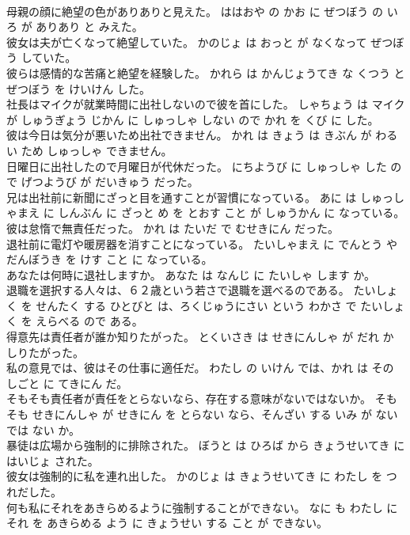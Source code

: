 \documentclass[8pt]{extreport}
\begin{document}
\begin{CJK}{UTF8}{min}
\\	母親の顔に絶望の色がありありと見えた。	ははおや の かお に ぜつぼう の いろ が ありあり と みえた。	
\\	彼女は夫が亡くなって絶望していた。	かのじょ は おっと が なくなって ぜつぼう していた。	
\\	彼らは感情的な苦痛と絶望を経験した。	かれら は かんじょうてき な くつう と ぜつぼう を けいけん した。	
\\	社長はマイクが就業時間に出社しないので彼を首にした。	しゃちょう は マイク が しゅうぎょう じかん に しゅっしゃ しない ので かれ を くび に した。	
\\	彼は今日は気分が悪いため出社できません。	かれ は きょう は きぶん が わるい ため しゅっしゃ できません。	
\\	日曜日に出社したので月曜日が代休だった。	にちようび に しゅっしゃ した ので げつようび が だいきゅう だった。	
\\	兄は出社前に新聞にざっと目を通すことが習慣になっている。	あに は しゅっしゃまえ に しんぶん に ざっと め を とおす こと が しゅうかん に なっている。	
\\	彼は怠惰で無責任だった。	かれ は たいだ で むせきにん だった。	
\\	退社前に電灯や暖房器を消すことになっている。	たいしゃまえ に でんとう や だんぼうき を けす こと に なっている。	
\\	あなたは何時に退社しますか。	あなた は なんじ に たいしゃ します か。	
\\	退職を選択する人々は、６２歳という若さで退職を選べるのである。	たいしょく を せんたく する ひとびと は、ろくじゅうにさい という わかさ で たいしょく を えらべる ので ある。	
\\	得意先は責任者が誰か知りたがった。	とくいさき は せきにんしゃ が だれ か しりたがった。	
\\	私の意見では、彼はその仕事に適任だ。	わたし の いけん では、かれ は その しごと に てきにん だ。	
\\	そもそも責任者が責任をとらないなら、存在する意味がないではないか。	そもそも せきにんしゃ が せきにん を とらない なら、そんざい する いみ が ない では ない か。	
\\	暴徒は広場から強制的に排除された。	ぼうと は ひろば から きょうせいてき に はいじょ された。	
\\	彼女は強制的に私を連れ出した。	かのじょ は きょうせいてき に わたし を つれだした。	
\\	何も私にそれをあきらめるように強制することができない。	なに も わたし に それ を あきらめる よう に きょうせい する こと が できない。	

\end{CJK}
\end{document}

